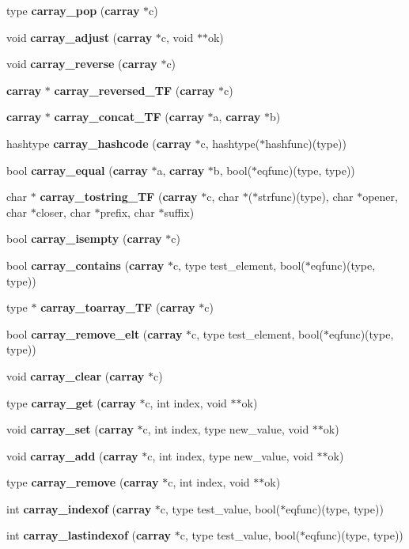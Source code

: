 \begin{DoxyCompactItemize}
\item 
type {\bf carray\+\_\+pop} ({\bf carray} $\ast$c)
\item 
void {\bf carray\+\_\+adjust} ({\bf carray} $\ast$c, void $\ast$$\ast$ok)
\item 
void {\bf carray\+\_\+reverse} ({\bf carray} $\ast$c)
\item 
{\bf carray} $\ast$ {\bf carray\+\_\+reversed\+\_\+\+TF} ({\bf carray} $\ast$c)
\item 
{\bf carray} $\ast$ {\bf carray\+\_\+concat\+\_\+\+TF} ({\bf carray} $\ast$a, {\bf carray} $\ast$b)
\item 
hashtype {\bf carray\+\_\+hashcode} ({\bf carray} $\ast$c, hashtype($\ast$hashfunc)(type))
\item 
bool {\bf carray\+\_\+equal} ({\bf carray} $\ast$a, {\bf carray} $\ast$b, bool($\ast$eqfunc)(type, type))
\item 
char $\ast$ {\bf carray\+\_\+tostring\+\_\+\+TF} ({\bf carray} $\ast$c, char $\ast$($\ast$strfunc)(type), char $\ast$opener, char $\ast$closer, char $\ast$prefix, char $\ast$suffix)
\item 
bool {\bf carray\+\_\+isempty} ({\bf carray} $\ast$c)
\item 
bool {\bf carray\+\_\+contains} ({\bf carray} $\ast$c, type test\+\_\+element, bool($\ast$eqfunc)(type, type))
\item 
type $\ast$ {\bf carray\+\_\+toarray\+\_\+\+TF} ({\bf carray} $\ast$c)
\item 
bool {\bf carray\+\_\+remove\+\_\+elt} ({\bf carray} $\ast$c, type test\+\_\+element, bool($\ast$eqfunc)(type, type))
\item 
void {\bf carray\+\_\+clear} ({\bf carray} $\ast$c)
\item 
type {\bf carray\+\_\+get} ({\bf carray} $\ast$c, int index, void $\ast$$\ast$ok)
\item 
void {\bf carray\+\_\+set} ({\bf carray} $\ast$c, int index, type new\+\_\+value, void $\ast$$\ast$ok)
\item 
void {\bf carray\+\_\+add} ({\bf carray} $\ast$c, int index, type new\+\_\+value, void $\ast$$\ast$ok)
\item 
type {\bf carray\+\_\+remove} ({\bf carray} $\ast$c, int index, void $\ast$$\ast$ok)
\item 
int {\bf carray\+\_\+indexof} ({\bf carray} $\ast$c, type test\+\_\+value, bool($\ast$eqfunc)(type, type))
\item 
int {\bf carray\+\_\+lastindexof} ({\bf carray} $\ast$c, type test\+\_\+value, bool($\ast$eqfunc)(type, type))
$$
\end{DoxyCompactItemize}
